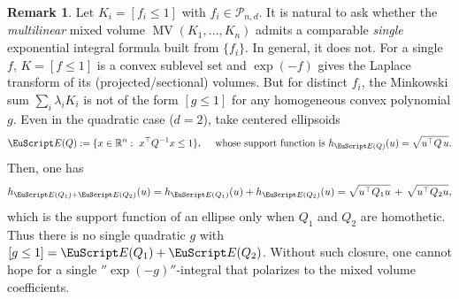 \documentclass[11pt]{article}
\newtheorem{example}[theorem]{Example}
\theoremstyle{definition}
\numberwithin{equation}{section}
\newtheorem{remark}[theorem]{Remark}
\newcommand{\R}{\mathbb{R}}
\newcommand{\cP}{\mathcal{P}}        %
\DeclareMathOperator{\MV}{MV}
\begin{document}

\begin{remark}
Let $K_i=[f_i\le1]$ with $f_i\in\cP_{n,d}$. It is natural to ask whether the \emph{multilinear} mixed volume $\MV(K_1,\dots,K_n)$ admits a comparable \emph{single} exponential integral formula built from $\{f_i\}$. 
In general, it does not.
For a single $f$, $K=[f\le1]$ is a convex sublevel set and $\exp(-f)$ gives the Laplace transform of its (projected/sectional) volumes.
But for distinct $f_i$, the Minkowski sum \(\textstyle\sum_i \lambda_i K_i\) is not of the form $[g\le1]$ for any homogeneous convex polynomial $g$. 
Even in the quadratic case ($d=2$), take centered ellipsoids
\[
\EuScript E(Q):=\{x \in \R^n:\ x^\top Q^{-1}x\le1\}, \quad \text{ whose support function is } h_{\EuScript E(Q)}(u)=\sqrt{u^\top Q\,u}.
\]
Then, one has
\[
h_{\EuScript E(Q_1)+ \EuScript E(Q_2)}(u) = h_{\EuScript E(Q_1)}(u) + h_{\EuScript E(Q_2)}(u)
= \sqrt{u^\top Q_1 u}\,+\,\sqrt{u^\top Q_2 u},
\]
which is the support function of an ellipse only when $Q_1$ and $Q_2$ are homothetic. 
Thus there is no single quadratic $g$ with $[g\le1] = \EuScript E (Q_1) + \EuScript E(Q_2)$.
Without such closure, one cannot hope for a single $'' \exp(-g) ''$-integral that polarizes to the mixed volume coefficients.
\end{remark}
\end{document}
